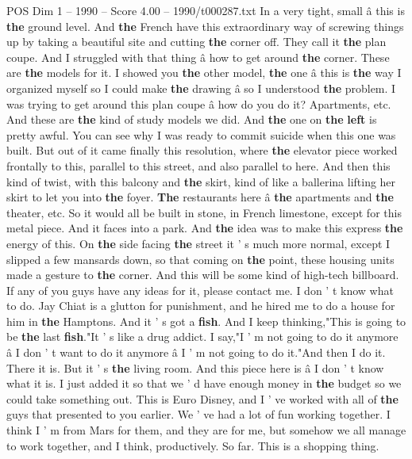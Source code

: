 \begin{textsample}{POS Dim 1 – 1990 – Score 4.00 – 1990/t000287.txt}
In a very tight, small â this is \textbf{the} ground level.
And \textbf{the} French have this extraordinary way of screwing things up by taking a beautiful site and cutting \textbf{the} corner off.
They call it \textbf{the} plan coupe.
And I struggled with that thing â how to get around \textbf{the} corner.
These are \textbf{the} models for it.
I showed you \textbf{the} other model, \textbf{the} one â this is \textbf{the} way I organized myself so I could make \textbf{the} drawing â so I understood \textbf{the} problem.
I was trying to get around this plan coupe â how do you do it?
Apartments, etc.
And these are \textbf{the} kind of study models we did.
And \textbf{the} one on \textbf{the} \textbf{left} is pretty awful.
You can see why I was ready to commit suicide when this one was built.
But out of it came finally this resolution, where \textbf{the} elevator piece worked frontally to this, parallel to this street, and also parallel to here.
And then this kind of twist, with this balcony and \textbf{the} skirt, kind of like a ballerina lifting her skirt to let you into \textbf{the} foyer. \textbf{The} restaurants here â \textbf{the} apartments and \textbf{the} theater, etc.
So it would all be built in stone, in French limestone, except for this metal piece.
And it faces into a park.
And \textbf{the} idea was to make this express \textbf{the} energy of this.
On \textbf{the} side facing \textbf{the} street it ' s much more normal, except I slipped a few mansards down, so that coming on \textbf{the} point, these housing units made a gesture to \textbf{the} corner.
And this will be some kind of high-tech billboard.
If any of you guys have any ideas for it, please contact me.
I don ' t know what to do.
Jay Chiat is a glutton for punishment, and he hired me to do a house for him in \textbf{the} Hamptons.
And it ' s got a \textbf{fish}.
And I keep thinking,"This is going to be \textbf{the} last \textbf{fish}."It ' s like a drug addict.
I say,"I ' m not going to do it anymore â I don ' t want to do it anymore â I ' m not going to do it."And then I do it.
There it is.
But it ' s \textbf{the} living room.
And this piece here is â I don ' t know what it is.
I just added it so that we ' d have enough money in \textbf{the} budget so we could take something out.
This is Euro Disney, and I ' ve worked with all of \textbf{the} guys that presented to you earlier.
We ' ve had a lot of fun working together.
I think I ' m from Mars for them, and they are for me, but somehow we all manage to work together, and I think, productively.
So far.
This is a shopping thing.

\end{textsample}
